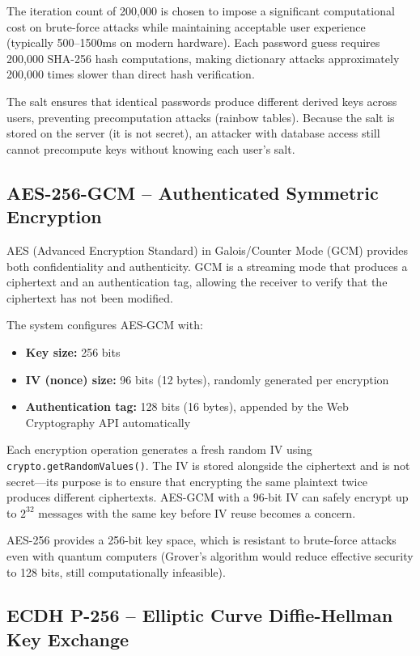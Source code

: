The iteration count of 200,000 is chosen to impose a significant computational cost on brute-force attacks while maintaining acceptable user experience (typically 500--1500ms on modern hardware). Each password guess requires 200,000 SHA-256 hash computations, making dictionary attacks approximately 200,000 times slower than direct hash verification.

The salt ensures that identical passwords produce different derived keys across users, preventing precomputation attacks (rainbow tables). Because the salt is stored on the server (it is not secret), an attacker with database access still cannot precompute keys without knowing each user's salt.

\subsection{AES-256-GCM -- Authenticated Symmetric Encryption}

AES (Advanced Encryption Standard) in Galois/Counter Mode (GCM) provides both confidentiality and authenticity. GCM is a streaming mode that produces a ciphertext and an authentication tag, allowing the receiver to verify that the ciphertext has not been modified.

The system configures AES-GCM with:
\begin{itemize}
    \item \textbf{Key size:} 256 bits
    \item \textbf{IV (nonce) size:} 96 bits (12 bytes), randomly generated per encryption
    \item \textbf{Authentication tag:} 128 bits (16 bytes), appended by the Web Cryptography API automatically
\end{itemize}

Each encryption operation generates a fresh random IV using \texttt{crypto.getRandomValues()}. The IV is stored alongside the ciphertext and is not secret---its purpose is to ensure that encrypting the same plaintext twice produces different ciphertexts. AES-GCM with a 96-bit IV can safely encrypt up to $2^{32}$ messages with the same key before IV reuse becomes a concern.

AES-256 provides a 256-bit key space, which is resistant to brute-force attacks even with quantum computers (Grover's algorithm would reduce effective security to 128 bits, still computationally infeasible).

\subsection{ECDH P-256 -- Elliptic Curve Diffie-Hellman Key Exchange}

